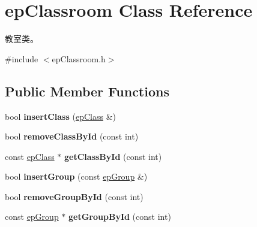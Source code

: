 \hypertarget{classepClassroom}{\section{ep\-Classroom \-Class \-Reference}
\label{classepClassroom}
}


教室类。  




{\ttfamily \#include $<$ep\-Classroom.\-h$>$}

\subsection*{\-Public \-Member \-Functions}
\begin{DoxyCompactItemize}
\item 
\hypertarget{classepClassroom_a6ca174262d616a591d028cff108f58d1}{bool {\bfseries insert\-Class} (\hyperlink{classepClass}{ep\-Class} \&)}\label{classepClassroom_a6ca174262d616a591d028cff108f58d1}

\item 
\hypertarget{classepClassroom_aa7c2a3d9326c34b8fbf104ceccbef8c7}{bool {\bfseries remove\-Class\-By\-Id} (const int)}\label{classepClassroom_aa7c2a3d9326c34b8fbf104ceccbef8c7}

\item 
\hypertarget{classepClassroom_a29c88f7305225fdd6bbcd62c43b41cf8}{const \hyperlink{classepClass}{ep\-Class} $\ast$ {\bfseries get\-Class\-By\-Id} (const int)}\label{classepClassroom_a29c88f7305225fdd6bbcd62c43b41cf8}

\item 
\hypertarget{classepClassroom_af33ef640f541aa4f0601aa4f014299e1}{bool {\bfseries insert\-Group} (const \hyperlink{classepGroup}{ep\-Group} \&)}\label{classepClassroom_af33ef640f541aa4f0601aa4f014299e1}

\item 
\hypertarget{classepClassroom_ae00ebe3bd7b4aa6bb685766500be14b5}{bool {\bfseries remove\-Group\-By\-Id} (const int)}\label{classepClassroom_ae00ebe3bd7b4aa6bb685766500be14b5}

\item 
\hypertarget{classepClassroom_a4212840b35f426d2ce24c8aa1e9d2ffb}{const \hyperlink{classepGroup}{ep\-Group} $\ast$ {\bfseries get\-Group\-By\-Id} (const int)}\label{classepClassroom_a4212840b35f426d2ce24c8aa1e9d2ffb}

\end{DoxyCompactItemize}

